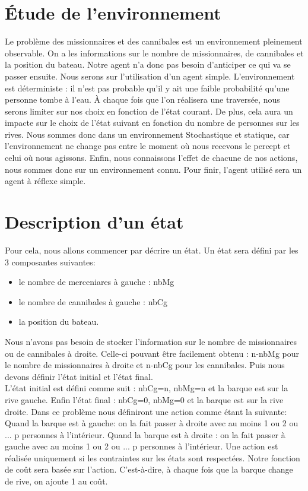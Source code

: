 \documentclass[a4paper, 12pt, french, oneside]{book}
\begin{document}
\section{Étude de l'environnement}
Le problème des missionnaires et des cannibales est un environnement pleinement observable. On a les informations sur le nombre de missionnaires, de cannibales et la position du bateau. Notre agent n'a donc pas besoin d'anticiper ce qui va se passer ensuite. Nous serons sur l'utilisation d'un agent simple. L'environnement est déterministe : il n'est pas probable qu'il y ait une faible probabilité qu'une personne tombe à l'eau. À chaque fois que l'on réalisera une traversée, nous serons limiter sur nos choix en fonction de l'état courant. De plus, cela aura un impacte sur le choix de l'état suivant en fonction du nombre de personnes sur les rives. Nous sommes donc dans un environnement Stochastique et statique, car l'environnement ne change pas entre le moment où nous recevons le percept et celui où nous agissons. Enfin, nous connaissons l'effet de chacune de nos actions, nous sommes donc sur un environnement connu. Pour finir, l'agent utilisé sera un agent à réflexe simple.

\section{Description d'un état}
Pour cela, nous allons commencer par décrire un état. Un état sera défini par les 3 composantes suivantes:
\begin{itemize}
    \item le nombre de merceniares à gauche : nbMg
    \item le nombre de cannibales à gauche : nbCg
    \item la position du bateau.
\end{itemize}
Nous n'avons pas besoin de stocker l'information sur le nombre de missionnaires ou de cannibales à droite. Celle-ci pouvant être facilement obtenu : n-nbMg pour le nombre de missionnaires à droite et n-nbCg pour les cannibales. Puis nous devons définir l'état initial et l'état final. \\
L'état initial est défini comme suit : nbCg=n, nbMg=n et la barque est sur la rive gauche. Enfin l'état final : nbCg=0, nbMg=0 et la barque est sur la rive droite. Dans ce problème nous définiront une action comme étant la suivante: Quand la barque est à gauche: on la fait passer à droite avec au moins 1 ou 2 ou ... p personnes à l'intérieur. Quand la barque est à droite : on la fait passer à gauche avec au moins 1 ou 2 ou ... p personnes à l'intérieur. Une action est réalisée uniquement si les contraintes sur les états sont respectées. Notre fonction de coût sera basée sur l'action. C'est-à-dire, à chaque fois que la barque change de rive, on ajoute 1 au coût.
\end{document}
